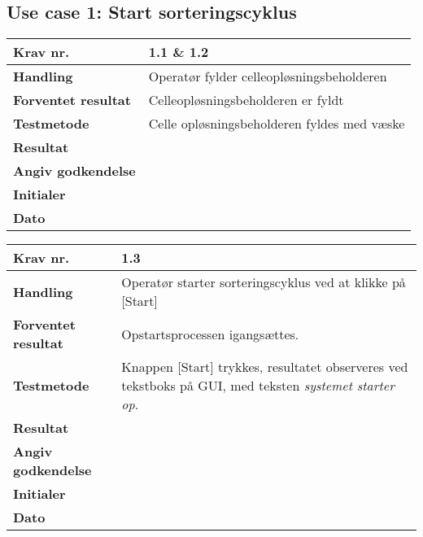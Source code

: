 \subsection{Use case 1: Start sorteringscyklus}

	\begin{center}
		\begin{longtable}{ | m{4cm}| m{8.5cm}|} 
			\hline
			\textbf{Krav nr.} & 1.1 \& 1.2    \\ 
			\hline
			\textbf{Handling} &  Operatør fylder celleopløsningsbeholderen   \\
			\hline
			\textbf{Forventet resultat} &  Celleopløsningsbeholderen er fyldt  \\
			\hline
			\textbf{Testmetode}  &  Celle opløsningsbeholderen fyldes med væske  \\
			\hline
			\textbf{Resultat}  &    \\
			\hline
			\textbf{Angiv godkendelse} &     \\
			\hline
			\textbf{Initialer} &     \\
			\hline
			\textbf{Dato} &    \\
			\hline
		\end{longtable}
	\end{center}
	
	
	\begin{center}
		\begin{longtable}{ | m{4cm}| m{8.5cm}|} 
			\hline
			\textbf{Krav nr.} & 1.3    \\ 
			\hline
			\textbf{Handling} &  Operatør starter sorteringscyklus ved at klikke på [Start]  \\
			\hline
			\textbf{Forventet resultat} &  Opstartsprocessen igangsættes.  \\
			\hline
			\textbf{Testmetode}  & Knappen [Start] trykkes, resultatet observeres ved tekstboks på GUI, med teksten \textit{systemet starter op}.   \\
			\hline
			\textbf{Resultat}  &    \\
			\hline
			\textbf{Angiv godkendelse} &     \\
			\hline
			\textbf{Initialer} &     \\
			\hline
			\textbf{Dato} &    \\
			\hline
		\end{longtable}
	\end{center}
	
	\newpage
	
